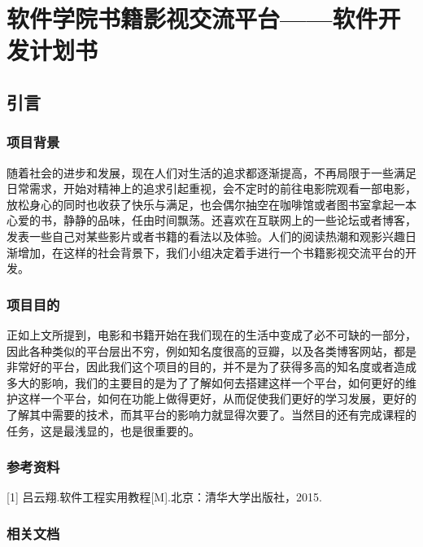 \documentclass[
]{article}
\author{}
\date{}
\begin{document}
\hypertarget{header-n3110}{%
\section{软件学院书籍影视交流平台------软件开发计划书}\label{header-n3110}}

\hypertarget{header-n3112}{%
\subsection{引言}\label{header-n3112}}

\hypertarget{header-n3113}{%
\subsubsection{项目背景}\label{header-n3113}}

随着社会的进步和发展，现在人们对生活的追求都逐渐提高，不再局限于一些满足日常需求，开始对精神上的追求引起重视，会不定时的前往电影院观看一部电影，放松身心的同时也收获了快乐与满足，也会偶尔抽空在咖啡馆或者图书室拿起一本心爱的书，静静的品味，任由时间飘荡。还喜欢在互联网上的一些论坛或者博客，发表一些自己对某些影片或者书籍的看法以及体验。人们的阅读热潮和观影兴趣日渐增加，在这样的社会背景下，我们小组决定着手进行一个书籍影视交流平台的开发。

\hypertarget{header-n3115}{%
\subsubsection{项目目的}\label{header-n3115}}

正如上文所提到，电影和书籍开始在我们现在的生活中变成了必不可缺的一部分，因此各种类似的平台层出不穷，例如知名度很高的豆瓣，以及各类博客网站，都是非常好的平台，因此我们这个项目的目的，并不是为了获得多高的知名度或者造成多大的影响，我们的主要目的是为了了解如何去搭建这样一个平台，如何更好的维护这样一个平台，如何在功能上做得更好，从而促使我们更好的学习发展，更好的了解其中需要的技术，而其平台的影响力就显得次要了。当然目的还有完成课程的任务，这是最浅显的，也是很重要的。

\hypertarget{header-n3117}{%
\subsubsection{参考资料}\label{header-n3117}}

{[}1{]} 吕云翔.软件工程实用教程{[}M{]}.北京：清华大学出版社，2015.

\hypertarget{header-n3119}{%
\subsubsection{相关文档}\label{header-n3119}}
\end{document}
